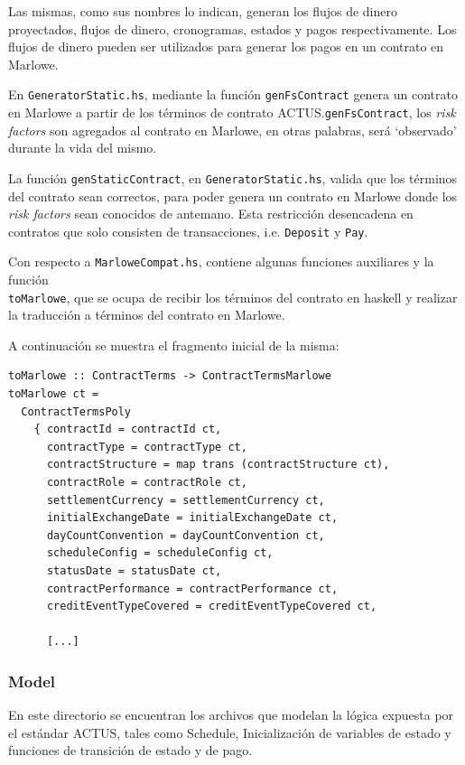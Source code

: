 \documentclass[12pt]{book}
\begin{document}
Las mismas, como sus nombres lo indican, generan los flujos de dinero proyectados, flujos de dinero, cronogramas, estados y pagos respectivamente. Los flujos de dinero pueden ser utilizados para generar los pagos en un contrato en Marlowe.

En \texttt{GeneratorStatic.hs}, mediante la función \texttt{genFsContract} genera un contrato en Marlowe a partir de los términos de contrato ACTUS.\@En \texttt{genFsContract}, los \textit{risk factors} son agregados al contrato en Marlowe, en otras palabras, será `observado' durante la vida del mismo.

La función \texttt{genStaticContract}, en \texttt{GeneratorStatic.hs}, valida que los términos del contrato sean correctos, para poder genera un contrato en Marlowe donde los \textit{risk factors} sean conocidos de antemano. Esta restricción desencadena en contratos que solo consisten de transacciones, i.e. \texttt{Deposit} y \texttt{Pay}.

Con respecto a \texttt{MarloweCompat.hs}, contiene algunas funciones auxiliares y la función\\ \texttt{toMarlowe}, que se ocupa de recibir los términos del contrato en haskell y realizar la traducción a términos del contrato en Marlowe. 

A continuación se muestra el fragmento inicial de la misma:


\begin{lstlisting}[style=Haskell-cardano, caption=Comienzo de la función \texttt{toMarlowe}.]
toMarlowe :: ContractTerms -> ContractTermsMarlowe
toMarlowe ct =
  ContractTermsPoly
    { contractId = contractId ct,
      contractType = contractType ct,
      contractStructure = map trans (contractStructure ct),
      contractRole = contractRole ct,
      settlementCurrency = settlementCurrency ct,
      initialExchangeDate = initialExchangeDate ct,
      dayCountConvention = dayCountConvention ct,
      scheduleConfig = scheduleConfig ct,
      statusDate = statusDate ct,
      contractPerformance = contractPerformance ct,
      creditEventTypeCovered = creditEventTypeCovered ct,

      [...]
\end{lstlisting}

\subsubsection{Model}

En este directorio se encuentran los archivos que modelan la lógica expuesta por el estándar ACTUS, tales como Schedule, Inicialización de variables de estado y funciones de transición de estado y de pago.
\end{document}
